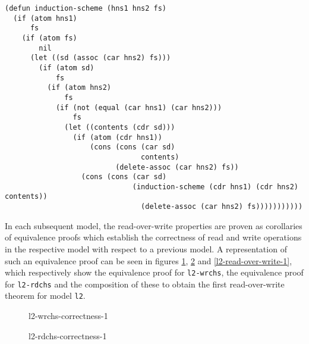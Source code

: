\documentclass[runningheads,a4paper]{llncs}
\begin{document}
\noindent
\begin{verbatim}
(defun induction-scheme (hns1 hns2 fs)
  (if (atom hns1)
      fs
    (if (atom fs)
        nil
      (let ((sd (assoc (car hns2) fs)))
        (if (atom sd)
            fs
          (if (atom hns2)
              fs
            (if (not (equal (car hns1) (car hns2)))
                fs
              (let ((contents (cdr sd)))
                (if (atom (cdr hns1))
                    (cons (cons (car sd)
                                contents)
                          (delete-assoc (car hns2) fs))
                  (cons (cons (car sd)
                              (induction-scheme (cdr hns1) (cdr hns2) contents))
                                (delete-assoc (car hns2) fs)))))))))))
\end{verbatim}

In each subsequent model, the read-over-write properties are proven as
corollaries of equivalence proofs which establish the correctness of
read and write operations in the respective model with respect to a
previous model. A representation of such an equivalence proof can be
seen in figures \ref{l2-wrchs-correctness-1},
\ref{l2-rdchs-correctness-1} and \ref{l2-read-over-write-1}, which
respectively show the equivalence proof for \texttt{l2-wrchs}, the
equivalence proof for \texttt{l2-rdchs} and the composition of these
to obtain the first read-over-write theorem for model \texttt{l2}.


\begin{figure}
  \centering
  \caption{l2-wrchs-correctness-1}
  \label{l2-wrchs-correctness-1}
\end{figure}

\begin{figure}
  \centering
  \caption{l2-rdchs-correctness-1}
  \label{l2-rdchs-correctness-1}
\end{figure}
\end{document}

